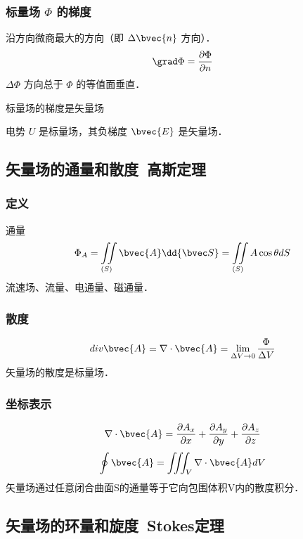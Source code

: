 \subsubsection{标量场 $\Phi$ 的梯度}
沿方向微商最大的方向（即 $\Delta \bvec{n}$ 方向）．
\begin{equation}\label{VecAnl_eq5}
\grad \Phi = \frac{\partial \Phi}{\partial n}
\end{equation}
$\Delta \Phi$ 方向总于 $\Phi$ 的等值面垂直．

标量场的梯度是矢量场

电势 $U$ 是标量场，其负梯度 $\bvec{E}$ 是矢量场．

\subsection{矢量场的通量和散度\ 高斯定理}%
\subsubsection{定义}
通量
\begin{equation}\label{VecAnl_eq6}
\Phi_A=\iint\limits_{(S)} \bvec{A} \dd{\bvec S} = \iint\limits_{(S)} A\cos\theta dS
\end{equation}
流速场、流量、电通量、磁通量．

\subsubsection{散度}
\begin{equation}\label{VecAnl_eq7}
div \bvec{A}=\nabla \cdot \bvec{A}=\lim_{\Delta V \to 0}\frac{\Phi}{\Delta V}
\end{equation}
矢量场的散度是标量场．

\subsubsection{坐标表示}
\begin{equation}\label{VecAnl_eq8}
\nabla \cdot \bvec{A}= \frac{\partial A_x}{\partial x}+\frac{\partial A_y}{\partial y}+\frac{\partial A_z}{\partial z}
\end{equation}
\begin{equation}\label{VecAnl_eq9}
\oint \bvec{A}=\iiint_V \nabla \cdot \bvec{A} dV
\end{equation}
矢量场通过任意闭合曲面S的通量等于它向包围体积V内的散度积分．
\subsection{矢量场的环量和旋度\ Stokes定理}%

